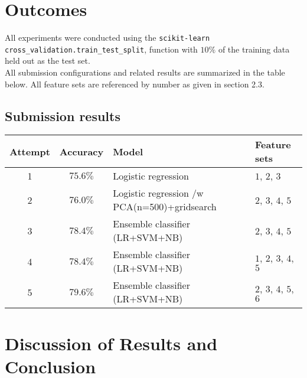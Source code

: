 \documentclass[
10pt, %
a4paper, %
oneside, %
headinclude,footinclude, %
BCOR5mm, %
]{scrartcl}
\begin{document}

\section{Outcomes}

All experiments were conducted using the \texttt{scikit-learn} 
\texttt{cross\_validation.train\_test\_split}, function with $10\%$ of
the training data held out as the test set. \\

\noindent All submission configurations and related results are 
summarized in the table below. All feature sets are referenced by number as 
given in section 2.3.

\subsection{Submission results}
\begin{center}
    \begin{tabular}{| c | c | l | l|}
    \hline
    Attempt & Accuracy & Model               & Feature sets    \\ \hline
    1       & $75.6\%$ & Logistic regression  & $1$, $2$, $3$  \\ \hline
    2       & $76.0\%$ & Logistic regression /w PCA(n=500)+gridsearch &  $2$, $3$, $4$, $5$ \\ \hline
    3       & $78.4\%$ & Ensemble classifier (LR+SVM+NB) &$2$, $3$, $4$, $5$       \\ \hline
    4       & $78.4\%$ & Ensemble classifier (LR+SVM+NB) & $1$, $2$, $3$, $4$, $5$ \\ \hline
    5       & $79.6\%$ & Ensemble classifier (LR+SVM+NB) & $2$, $3$, $4$, $5$, $6$ \\ \hline
    \end{tabular}
\end{center}

\section{Discussion of Results and Conclusion}
\end{document}

